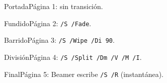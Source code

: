 \documentclass[aspectratio=169]{beamer}
\begin{document}
\begin{frame}{Portada}\centering Página 1: sin transición.\end{frame}
\begin{frame}{Fundido}\transfade\centering Página 2: \texttt{/S /Fade}.\end{frame}
\begin{frame}{Barrido}\transwipe[direction=90]\centering Página 3: \texttt{/S /Wipe /Di 90}.\end{frame}
\begin{frame}{División}\transsplitverticalin\centering Página 4: \texttt{/S /Split /Dm /V /M /I}.\end{frame}
\begin{frame}{Final}\centering Página 5: Beamer escribe \texttt{/S /R} (instantánea).\end{frame}
\end{document}
